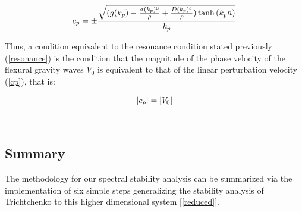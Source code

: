 \documentclass{article}
\begin{document}
\begin{equation} \label{cp}
  c_{p} = \pm \frac{\sqrt{(g(k_{p}) - \frac{\sigma(k_{p})^3}{\rho} + \frac{D(k_{p})^5}{\rho})\tanh{(k_{p}h)}}}{k_{p}}
\\
\end{equation} 

Thus, a condition equivalent to the resonance condition stated previously (\ref{resonance}) is the condition that the magnitude of the phase velocity of the flexural gravity waves \(V_{0}\) is equivalent to that of the linear perturbation velocity (\ref{cp}), that is:

\begin{equation} \label{resonance2}
  |c_{p}| = |V_0| \\
\end{equation} 


\\

\subsection{Summary}

The methodology for our spectral stability analysis can be summarized via the implementation of six simple steps generalizing the stability analysis of Trichtchenko to this higher dimensional system [\ref{reduced}].
\end{document}
